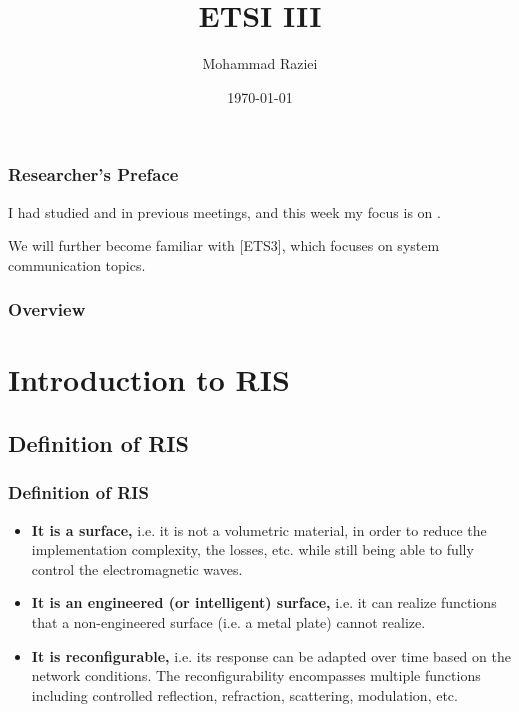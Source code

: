 \documentclass{beamer}
\title{ETSI III} %
\author{Mohammad Raziei} %
\institute[Sharif University] %
{
Sharif University of Technology\\ %
\medskip
\textit{mohammadraziei1375@gmail.com} %
}
\date{\today} %
\let\olditem\item
\renewcommand\item{\olditem\justifying}
\newcommand{\mypause}{\pause}
\begin{document}
\begin{frame}
\centering
\titlepage %
\end{frame}


\begin{frame}
	\frametitle{Researcher's Preface}
	
	I had studied \supercite{etsi1v1} and \supercite{etsi2v1} in previous meetings, and this week my focus is on \supercite{etsi3v1}.
	
	We will further become familiar with [ETS3], which focuses on system communication topics.
\end{frame}


\begin{frame}
    \frametitle{Overview} %
    \tableofcontents 
\end{frame}




\section{Introduction to RIS}


\subsection{Definition of RIS}
\begin{frame}
	\frametitle{Definition of RIS}
	
	\begin{itemize}
	\mypause
	\item \textbf{It is a surface,} i.e. it is not a volumetric material, in order to reduce the implementation complexity, the losses,
	etc. while still being able to fully control the electromagnetic waves.
	\mypause
	\item\textbf{ It is an engineered (or intelligent) surface,} i.e. it can realize functions that a non-engineered surface (i.e. a
	metal plate) cannot realize.
	\mypause
	\item \textbf{It is reconfigurable,} i.e. its response can be adapted over time based on the network conditions. The
	reconfigurability encompasses multiple functions including controlled reflection, refraction, scattering,
	modulation, etc.
\end{itemize}
\end{frame}
\end{document}
